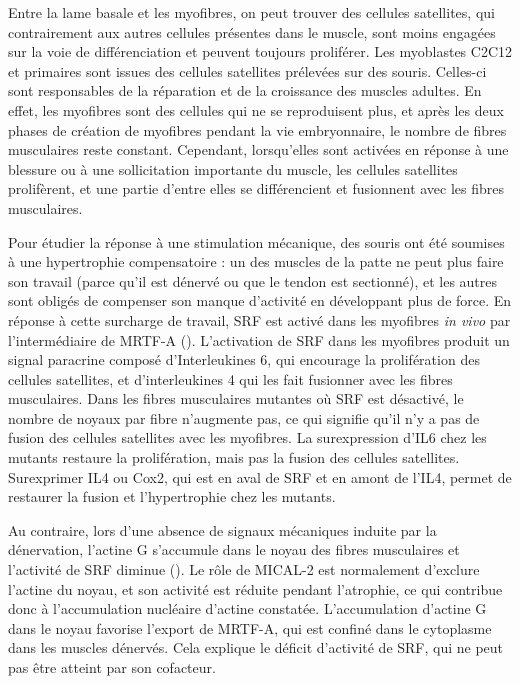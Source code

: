 Entre la lame basale et les myofibres, on peut trouver des cellules satellites, qui contrairement aux autres cellules présentes dans le muscle, sont moins engagées sur la voie de différenciation et peuvent toujours proliférer. Les myoblastes C2C12 et primaires sont issues des cellules satellites prélevées sur des souris. Celles-ci sont responsables de la réparation et de la croissance des muscles adultes. 
En effet, les myofibres sont des cellules qui ne se reproduisent plus, et après les deux phases de création de myofibres pendant la vie embryonnaire, le nombre de fibres musculaires reste constant. 
Cependant, lorsqu'elles sont activées en réponse à une blessure ou à une sollicitation importante du muscle, les cellules satellites prolifèrent, et une partie d'entre elles se différencient et fusionnent avec les fibres musculaires. 

Pour étudier la réponse à une stimulation mécanique, des souris ont été soumises à une hypertrophie compensatoire : un des muscles de la patte ne peut plus faire son travail (parce qu’il est dénervé ou que le tendon est sectionné), et les autres sont obligés de compenser son manque d'activité en développant plus de force. En réponse à cette surcharge de travail, SRF est activé dans les myofibres \textit{in vivo} par l'intermédiaire de MRTF-A  (\cite{guerci_srf-dependent_2012}). 
L'activation de SRF dans les myofibres produit un signal paracrine composé d'Interleukines 6, qui encourage la prolifération des cellules satellites, et d'interleukines 4 qui les fait fusionner avec les fibres musculaires. 
Dans les fibres musculaires mutantes où SRF est désactivé, le nombre de noyaux par fibre n'augmente pas, ce qui signifie qu'il n'y a pas de fusion des cellules satellites avec les myofibres. La surexpression d'IL6 chez les mutants restaure la prolifération, mais pas la fusion des cellules satellites. Surexprimer IL4 ou Cox2, qui est en aval de SRF et en amont de l'IL4, permet de restaurer la fusion et l'hypertrophie chez les mutants. 


Au contraire, lors d'une absence de signaux mécaniques induite par la dénervation, l'actine G s'accumule dans le noyau des fibres musculaires et l'activité de SRF diminue (\cite{collard_nuclear_2014}). Le rôle de MICAL-2 est normalement d'exclure l'actine du noyau, et son activité est réduite pendant l'atrophie, ce qui contribue donc à l'accumulation nucléaire d'actine constatée. 
L'accumulation d'actine G dans le noyau favorise l'export de MRTF-A, qui est confiné dans le cytoplasme dans les muscles dénervés. Cela explique le déficit d'activité de SRF, qui ne peut pas être atteint par son cofacteur. 

